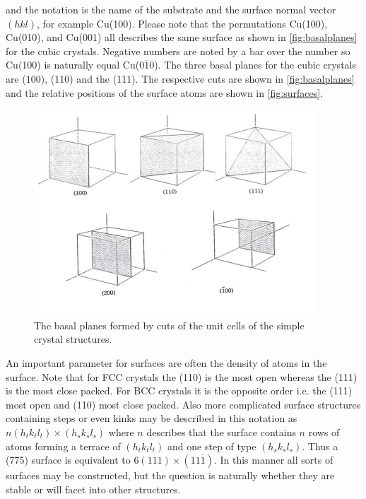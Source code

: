 \noindent and the  notation is the name of the substrate and the surface normal vector $(hkl)$, for example Cu(100). Please note that the permutations Cu(100), Cu(010), and Cu(001) all describes the same surface as shown in \autoref{fig:basalplanes} for the cubic crystals. Negative numbers are noted by a bar over the number so Cu(100) is naturally equal Cu(0$\overline{1}$0). The three basal planes for the cubic crystals are (100), (110) and the (111). The respective cuts are shown in \autoref{fig:basalplanes} and the relative positions of the surface atoms are shown in \autoref{fig:surfaces}.

\begin{figure}[h!]
	\begin{center}
	\includegraphics[scale=4]{figures/09_02.png}
	\caption{The basal planes formed by cuts of the unit cells of the simple crystal structures.}
	\label{fig:basalplanes}
	\end{center}
\end{figure}

An important parameter for surfaces are often the density of atoms in the surface. Note that for FCC crystals the (110) is the most open whereas the (111) is the most close packed. For BCC crystals it is the opposite order i.e. the (111) most open and (110) most close packed. Also more complicated surface structures containing steps or even kinks may be described in this notation as $n(h_tk_tl_t)\times(h_sk_sl_s)$ where $n$ describes that the surface contains $n$ rows of atoms forming a terrace of $(h_tk_tl_t)$ and one step of type $(h_sk_sl_s)$. Thus a (775) surface is equivalent to $6(111)\times(11\overline{1})$. In this manner all sorts of surfaces may be constructed, but the question is naturally whether they are stable or will facet into other structures.

